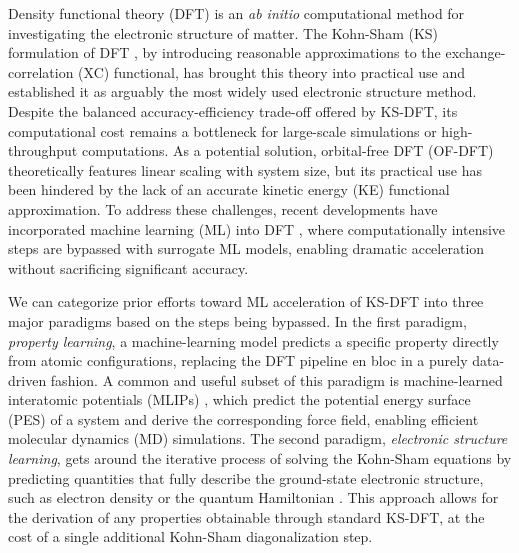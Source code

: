 \documentclass[%
reprint,
superscriptaddress,
bibnotes,
amsmath,amssymb,
aps,
floatfix, %
]{revtex4-2}
\begin{document}
\noindent Density functional theory (DFT) \cite{hohenberg1964} is an \textit{ab initio} computational method for investigating the electronic structure of matter. The Kohn-Sham (KS) formulation of DFT \cite{kohn1965}, by introducing reasonable approximations to the exchange-correlation (XC) functional, has brought this theory into practical use and established it as arguably the most widely used electronic structure method. Despite the balanced accuracy-efficiency trade-off offered by KS-DFT, its computational cost remains a bottleneck for large-scale simulations or high-throughput computations. As a potential solution, orbital-free DFT (OF-DFT) \cite{mi2023orbital} theoretically features linear scaling with system size, but its practical use has been hindered by the lack of an accurate kinetic energy (KE) functional approximation. To address these challenges, recent developments have incorporated machine learning (ML) into DFT \cite{zhang2023artificial}, where computationally intensive steps are bypassed with surrogate ML models, enabling dramatic acceleration without sacrificing significant accuracy.

We can categorize prior efforts toward ML acceleration of KS-DFT into three major paradigms based on the steps being bypassed. In the first paradigm, \textit{property learning}, a machine-learning model predicts a specific property directly from atomic configurations, replacing the DFT pipeline en bloc in a purely data-driven fashion. A common and useful subset of this paradigm is machine-learned interatomic potentials (MLIPs) \cite{chmiela2017md17, schnet2017, zhang2018deep, Batzner2022, batatia2022mace, chmiela2023md22}, which predict the potential energy surface (PES) of a system and derive the corresponding force field, enabling efficient molecular dynamics (MD) simulations. The second paradigm, \textit{electronic structure learning}, gets around the iterative process of solving the Kohn-Sham equations by predicting quantities that fully describe the ground-state electronic structure, such as electron density \cite{brockherde2017bypassing, grisafi2019, fabrizio2019electron, zepeda2021deep, unke2021se3, qiao2022, jorgensen2022, rackers2023, grisafi2023, koker2023higherorder, shao2023machine} or the quantum Hamiltonian \cite{unke2021se3, gu2022neural, nigam2022equivariant, li2022deep, gu2023deeptb, gong2023general, yu2023efficient}. This approach allows for the derivation of any properties obtainable through standard KS-DFT, at the cost of a single additional Kohn-Sham diagonalization step.
\end{document}
